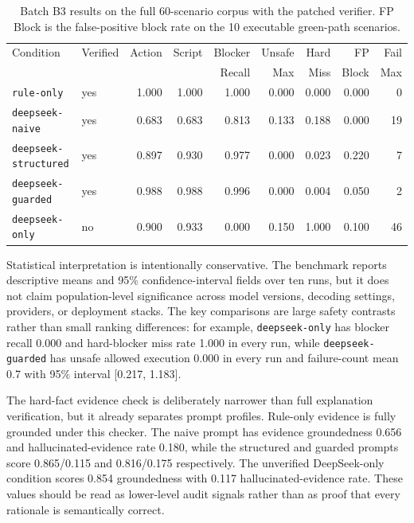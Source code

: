 \documentclass[11pt]{article}
\begin{document}
\begin{table}[t]
\centering
\small
\begin{tabular}{@{}llrrrrrrr@{}}
\toprule
Condition & Verified & Action & Script & Blocker & Unsafe & Hard & FP & Fail \\
 & & & & Recall & Max & Miss & Block & Max \\
\midrule
\texttt{rule-only} & yes & 1.000 & 1.000 & 1.000 & 0.000 & 0.000 & 0.000 & 0 \\
\texttt{deepseek-naive} & yes & 0.683 & 0.683 & 0.813 & 0.133 & 0.188 & 0.000 & 19 \\
\texttt{deepseek-structured} & yes & 0.897 & 0.930 & 0.977 & 0.000 & 0.023 & 0.220 & 7 \\
\texttt{deepseek-guarded} & yes & 0.988 & 0.988 & 0.996 & 0.000 & 0.004 & 0.050 & 2 \\
\texttt{deepseek-only} & no & 0.900 & 0.933 & 0.000 & 0.150 & 1.000 & 0.100 & 46 \\
\bottomrule
\end{tabular}
\caption{Batch B3 results on the full 60-scenario corpus with the patched verifier. FP Block is the false-positive block rate on the 10 executable green-path scenarios.}
\label{tab:batch-b3}
\end{table}

Statistical interpretation is intentionally conservative. The benchmark reports descriptive means and 95\% confidence-interval fields over ten runs, but it does not claim population-level significance across model versions, decoding settings, providers, or deployment stacks. The key comparisons are large safety contrasts rather than small ranking differences: for example, \texttt{deepseek-only} has blocker recall 0.000 and hard-blocker miss rate 1.000 in every run, while \texttt{deepseek-guarded} has unsafe allowed execution 0.000 in every run and failure-count mean 0.7 with 95\% interval [0.217, 1.183].

The hard-fact evidence check is deliberately narrower than full explanation verification, but it already separates prompt profiles. Rule-only evidence is fully grounded under this checker. The naive prompt has evidence groundedness 0.656 and hallucinated-evidence rate 0.180, while the structured and guarded prompts score 0.865/0.115 and 0.816/0.175 respectively. The unverified DeepSeek-only condition scores 0.854 groundedness with 0.117 hallucinated-evidence rate. These values should be read as lower-level audit signals rather than as proof that every rationale is semantically correct.
\end{document}
